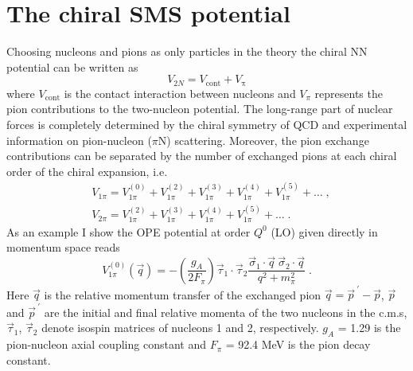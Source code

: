 \section{The chiral SMS potential}
\label{chiral_model}
Choosing nucleons and pions as only particles in the theory the chiral NN potential can be written as
\begin{equation}
V_{2N} =  V_{\mathrm{cont}} + V_{\mathrm{\pi}}
\label{eg:ch1}
\end{equation}
where $V_{\mathrm{cont}}$ is the contact interaction between nucleons and $V_{\pi}$ represents the pion contributions to the two-nucleon potential. The long-range part of nuclear forces is completely determined
by the chiral symmetry of QCD and experimental information on pion-nucleon ($\pi$N) scattering. Moreover, the pion exchange contributions can be separated by the number of exchanged pions at each chiral order of the chiral expansion, i.e.
\begin{equation}
\begin{split}
&V_{1\pi} = V^{(0)}_{1\pi} + V^{(2)}_{1\pi} + V^{(3)}_{1\pi} + V^{(4)}_{1\pi} + V^{(5)}_{1\pi} + \ldots\;,\\
&V_{2\pi} = V^{(2)}_{1\pi} + V^{(3)}_{1\pi} + V^{(4)}_{1\pi} + V^{(5)}_{1\pi} + \ldots\;.
\end{split}
\label{eg:ch2}
\end{equation}
As an example I show the OPE potential at order $Q^{0}$ (LO) given directly in momentum space reads
\begin{equation}
V^{(0)}_{1\pi}(\vec{q}) = -\left(\frac{g_{A}}{2F_{\pi}}\right)\vec{\tau}_{1}\cdot\vec{\tau}_{2}\frac{\vec{\sigma}_{1}\cdot\vec{q}~\vec{\sigma}_{2}\cdot\vec{q}}{q^{2} + m^{2}_{\pi}}\;.
\end{equation}
Here $\vec{q}$ is the relative momentum transfer of the exchanged pion $\vec{q} = \vec{p}^{~\prime} - \vec{p}$, $\vec{p}$ and $\vec{p}^{~\prime}$ are the initial and final relative momenta of the two nucleons in the c.m.s, $\vec{\tau}_{1}$, $\vec{\tau}_{2}$ denote isospin matrices of nucleons 1 and 2, respectively. $g_{A}$ = 1.29 is the pion-nucleon axial coupling constant and $F_{\pi}$ = 92.4 MeV is the pion decay constant. 

